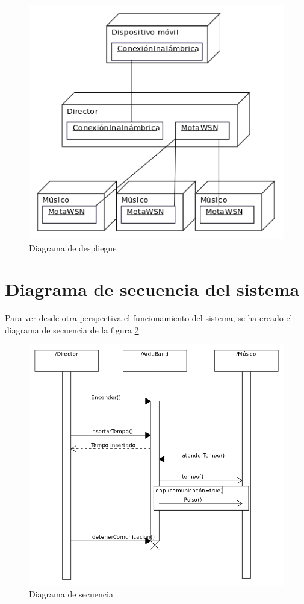 \begin{figure}[htb]
\centering
\includegraphics[width=1\textwidth]{./imagenes/diagramadespliegue}
\caption{Diagrama de despliegue} \label{fig:diagramadespliegue}
\end{figure}

\section{Diagrama de secuencia del sistema}
Para ver desde otra perspectiva el funcionamiento del sistema, se ha creado el diagrama
de secuencia de la figura \ref{fig:diagramasecuencia}\\


\begin{figure}[!htb]
\centering
\includegraphics[width=1\textwidth]{./imagenes/diagramasecuencia}
\caption{Diagrama de secuencia} \label{fig:diagramasecuencia}
\end{figure}


